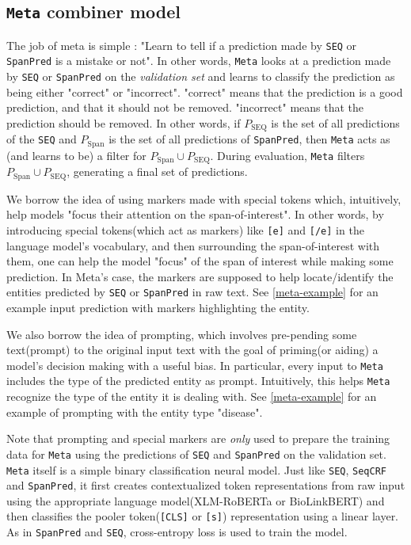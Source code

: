 \documentclass[11pt]{article}
\begin{document}
\subsection{\texttt{Meta} combiner model}
The job of meta is simple : "Learn to tell if a prediction made by \texttt{SEQ} or \texttt{SpanPred} is a mistake or not". In other words, \texttt{Meta} looks at a prediction made by \texttt{SEQ} or \texttt{SpanPred} on the \textit{validation set} and learns to classify the prediction as being either "correct" or "incorrect". "correct" means that the prediction is a good prediction, and that it should not be removed. "incorrect" means that the prediction should be removed. In other words, if $P_{\text{SEQ}}$ is the set of all predictions of the \texttt{SEQ} and $P_{\text{Span}}$ is the set of all predictions of \texttt{SpanPred}, then \texttt{Meta} acts as (and learns to be) a filter for $P_{\text{Span}} \cup P_{\text{SEQ}}$. During evaluation, \texttt{Meta} filters $P_{\text{Span}} \cup P_{\text{SEQ}}$, generating a final set of predictions.

\par We borrow the idea of using markers made with special tokens \cite{baldini-soares-etal-2019-matching, xiao-etal-2020-denoising, ye-etal-2022-packed} which, intuitively, help models "focus their attention on the span-of-interest". In other words, by introducing special tokens(which act as markers) like \texttt{[e]} and \texttt{[/e]} in the language model's vocabulary, and then surrounding the span-of-interest with them, one can help the model "focus" of the span of interest while making some prediction. In Meta's case, the markers are supposed to help locate/identify the entities predicted by \texttt{SEQ} or \texttt{SpanPred} in raw text. See \autoref{meta-example} for an example input prediction with markers highlighting the entity.\par 

We also borrow the idea of prompting\cite{li-etal-2020-unified}, which involves pre-pending some text(prompt) to the original input text with the goal of priming(or aiding) a model's decision making with a useful bias. In particular, every input to \texttt{Meta} includes the type of the predicted entity as prompt. Intuitively, this helps \texttt{Meta}  recognize the type of the entity it is dealing with. See \autoref{meta-example} for an example of prompting with the entity type "disease".\par

 Note that prompting and special markers are \textit{only} used to prepare the training data for \texttt{Meta} using the predictions of \texttt{SEQ} and \texttt{SpanPred} on the validation set. \texttt{Meta} itself is a simple binary classification neural model. Just like \texttt{SEQ}, \texttt{SeqCRF} and \texttt{SpanPred}, it first creates contextualized token representations from raw input using the appropriate language model(XLM-RoBERTa or BioLinkBERT) and then classifies the pooler token(\texttt{[CLS]} or \texttt{[s]}) representation using a linear layer. As in \texttt{SpanPred} and \texttt{SEQ}, cross-entropy loss is used to train the model.\par
\end{document}
